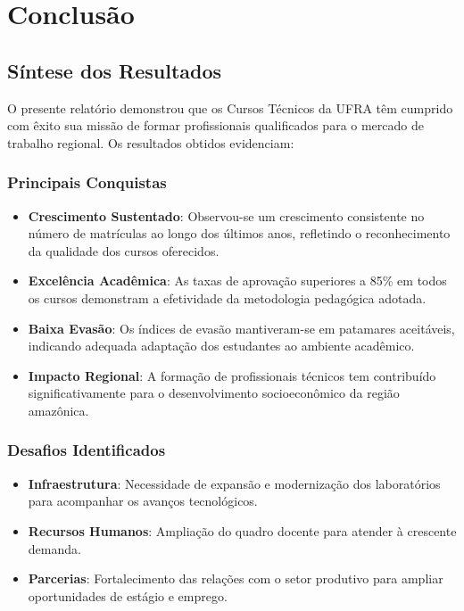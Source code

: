 \documentclass[
  12pt,
  letterpaper,
]{report}
\begin{document}

\chapter{Conclusão}\label{conclusuxe3o}

\section{Síntese dos Resultados}\label{suxedntese-dos-resultados}

O presente relatório demonstrou que os Cursos Técnicos da UFRA têm
cumprido com êxito sua missão de formar profissionais qualificados para
o mercado de trabalho regional. Os resultados obtidos evidenciam:

\subsection{Principais Conquistas}\label{principais-conquistas}

\begin{itemize}
\item
  \textbf{Crescimento Sustentado}: Observou-se um crescimento
  consistente no número de matrículas ao longo dos últimos anos,
  refletindo o reconhecimento da qualidade dos cursos oferecidos.
\item
  \textbf{Excelência Acadêmica}: As taxas de aprovação superiores a 85\%
  em todos os cursos demonstram a efetividade da metodologia pedagógica
  adotada.
\item
  \textbf{Baixa Evasão}: Os índices de evasão mantiveram-se em patamares
  aceitáveis, indicando adequada adaptação dos estudantes ao ambiente
  acadêmico.
\item
  \textbf{Impacto Regional}: A formação de profissionais técnicos tem
  contribuído significativamente para o desenvolvimento socioeconômico
  da região amazônica.
\end{itemize}

\subsection{Desafios Identificados}\label{desafios-identificados}

\begin{itemize}
\item
  \textbf{Infraestrutura}: Necessidade de expansão e modernização dos
  laboratórios para acompanhar os avanços tecnológicos.
\item
  \textbf{Recursos Humanos}: Ampliação do quadro docente para atender à
  crescente demanda.
\item
  \textbf{Parcerias}: Fortalecimento das relações com o setor produtivo
  para ampliar oportunidades de estágio e emprego.
\end{itemize}
\end{document}
